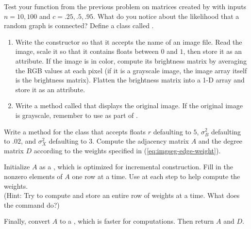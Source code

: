 Test your function from the previous problem on matrices created by  with inputs $n = 10, 100$ and $c = .25, .5, .95$.
What do you notice about the likelihood that a random graph is connected?
Define a class called .
\begin{enumerate}
    \item Write the constructor so that it accepts the name of an image file.
    Read the image, scale it so that it contains floats between $0$ and $1$, then store it as an attribute.
    If the image is in color, compute its brightness matrix by averaging the RGB values at each pixel (if it is a grayscale image, the image array itself is the brightness matrix).
    Flatten the brightness matrix into a 1-D array and store it as an attribute.

    \item Write a method called  that displays the original image.
    If the original image is grayscale, remember to use  as part of .
\end{enumerate}

Write a method for the  class that accepts floats $r$ defaulting to $5$, $\sigma_B^2$ defaulting to $.02$, and $\sigma_X^2$ defaulting to $3$.
Compute the adjacency matrix $A$ and the degree matrix $D$ according to the weights specified in (\ref{eq:imgseg-edge-weight}).

Initialize $A$ as a , which is optimized for incremental construction.
Fill in the nonzero elements of $A$ one row at a time.
Use  at each step to help compute the weights.
\\(Hint: Try to compute and store an entire row of weights at a time.
What does the command  do?)

Finally, convert $A$ to a , which is faster for computations.
Then return $A$ and $D$.
\label{prob:imgseg-compute-adjacency}

